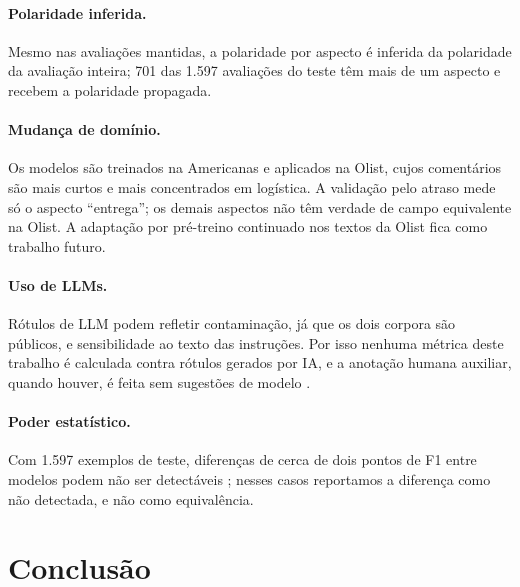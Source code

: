 \documentclass[a4paper, twocolumn, 11pt, twoside]{article}
\begin{document}
\paragraph{Polaridade inferida.} Mesmo nas avaliações mantidas, a polaridade por aspecto é inferida da polaridade da avaliação inteira; 701 das 1.597 avaliações do teste têm mais de um aspecto e recebem a polaridade propagada.

\paragraph{Mudança de domínio.} Os modelos são treinados na Americanas e aplicados na Olist, cujos comentários são mais curtos e mais concentrados em logística. A validação pelo atraso mede só o aspecto ``entrega''; os demais aspectos não têm verdade de campo equivalente na Olist. A adaptação por pré-treino continuado nos textos da Olist \citep{gururangan2020dont} fica como trabalho futuro.

\paragraph{Uso de LLMs.} Rótulos de LLM podem refletir contaminação, já que os dois corpora são públicos, e sensibilidade ao texto das instruções. Por isso nenhuma métrica deste trabalho é calculada contra rótulos gerados por IA, e a anotação humana auxiliar, quando houver, é feita sem sugestões de modelo \citep{schroeder2025hitl}.

\paragraph{Poder estatístico.} Com 1.597 exemplos de teste, diferenças de cerca de dois pontos de F1 entre modelos podem não ser detectáveis \citep{card2020power}; nesses casos reportamos a diferença como não detectada, e não como equivalência.

\section{Conclusão}
\end{document}
